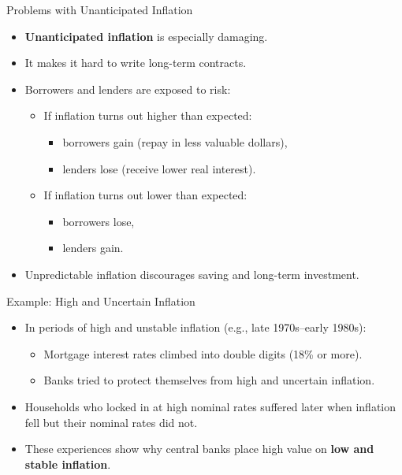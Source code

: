 \documentclass[aspectratio=169]{beamer}
\begin{document}
\begin{frame}{Problems with Unanticipated Inflation}
\transfade
\begin{itemize}
  \item \textbf{Unanticipated inflation} is especially damaging.
  \item It makes it hard to write long-term contracts.
  \item Borrowers and lenders are exposed to risk:
  \begin{itemize}
    \item If inflation turns out higher than expected:
    \begin{itemize}
      \item borrowers gain (repay in less valuable dollars),
      \item lenders lose (receive lower real interest).
    \end{itemize}
    \item If inflation turns out lower than expected:
    \begin{itemize}
      \item borrowers lose,
      \item lenders gain.
    \end{itemize}
  \end{itemize}
  \item Unpredictable inflation discourages saving and long-term investment.
\end{itemize}
\end{frame}

\begin{frame}{Example: High and Uncertain Inflation}
\transfade
\begin{itemize}
  \item In periods of high and unstable inflation (e.g., late 1970s–early 1980s):
  \begin{itemize}
    \item Mortgage interest rates climbed into double digits (18\% or more).
    \item Banks tried to protect themselves from high and uncertain inflation.
  \end{itemize}
  \item Households who locked in at high nominal rates suffered later when inflation fell but their nominal rates did not.
  \item These experiences show why central banks place high value on \textbf{low and stable inflation}.
\end{itemize}
\end{frame}
\end{document}
